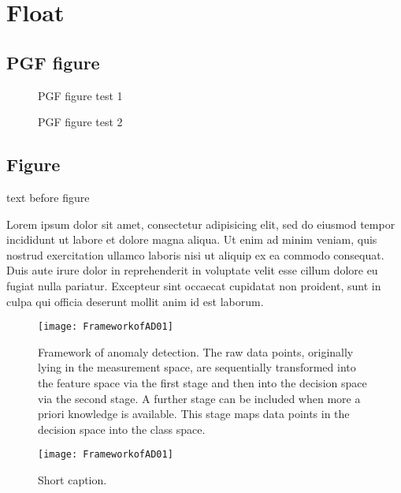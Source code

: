 \documentclass[10pt,a4paper,extrafontsizes,oldfontcommands,oneside]{memoir}
\begin{document}
\section{Float} %
\label{sec:float}

\subsection{PGF figure} %
\label{sub:pgf_figure}

\begin{figure}[!htbp]

\caption{PGF figure test 1}
\label{fig:pgftest}
\end{figure}

\begin{figure}[!htbp]

\caption{PGF figure test 2}
\label{fig:pgftest2}
\end{figure}



\subsection{Figure} %
\label{sub:figure}

text before figure

Lorem ipsum dolor sit amet, consectetur adipisicing elit, sed do eiusmod tempor incididunt ut labore et dolore magna aliqua. Ut enim ad minim veniam, quis nostrud exercitation ullamco laboris nisi ut aliquip ex ea commodo consequat. Duis aute irure dolor in reprehenderit in voluptate velit esse cillum dolore eu fugiat nulla pariatur. Excepteur sint occaecat cupidatat non proident, sunt in culpa qui officia deserunt mollit anim id est laborum.

\begin{figure}[!htbp]
\centering{}\texttt{[image: FrameworkofAD01]} \caption{Framework of anomaly detection. The raw data points, originally lying
in the measurement space, are sequentially transformed into the feature
space via the first stage and then into the decision space via the
second stage. A further stage can be included when more a priori knowledge
is available. This stage maps data points in the decision space into
the class space.}
\label{fig:ADFramework}
\end{figure}

\begin{figure}[!htbp]
\centering{}\texttt{[image: FrameworkofAD01]} \caption{Short caption.}
\label{fig:ADFramework1}
\end{figure}
\end{document}
